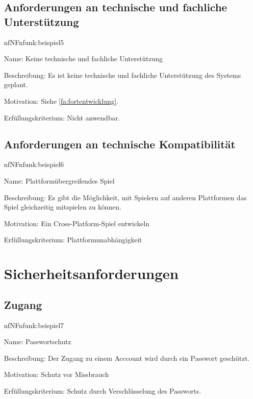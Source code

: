 \subsection{Anforderungen an technische und fachliche Unterstützung}

\begin{description}[leftmargin=5em, style=sameline]	
	\begin{lhp}{nf}{NF}{nfunk:beispiel5}
		\item [Name:] Keine technische und fachliche Unterstützung
		\item [Beschreibung:] Es ist keine technische und fachliche Unterstützung des Systems geplant.
		\item [Motivation:] Siehe \ref{fa:fortentwicklung}.
		\item [Erfüllungskriterium:] Nicht anwendbar.
	\end{lhp}
\end{description}

\subsection{Anforderungen an technische Kompatibilität}

\begin{description}[leftmargin=5em, style=sameline]	
	\begin{lhp}{nf}{NF}{nfunk:beispiel6}
		\item [Name:] Plattformübergreifendes Spiel
		\item [Beschreibung:] Es gibt die Möglichkeit, mit Spielern auf anderen Plattformen das Spiel gleichzeitig mitspielen zu können.
		\item [Motivation:] Ein Cross-Platform-Spiel entwickeln
		\item [Erfüllungskriterium:]Plattformunabhängigkeit
	\end{lhp}
\end{description}

\section{Sicherheitsanforderungen}

\subsection{Zugang}

\begin{description}[leftmargin=5em, style=sameline]	
	\begin{lhp}{nf}{NF}{nfunk:beispiel7}
		\item [Name:] Passwortschutz
		\item [Beschreibung:] Der Zugang zu einem Acccount wird durch ein Passwort geschützt. 
		\item [Motivation:] Schutz vor Missbrauch
		\item [Erfüllungskriterium:] Schutz durch Verschlüsselung des Passworts.
	\end{lhp}
\end{description}

